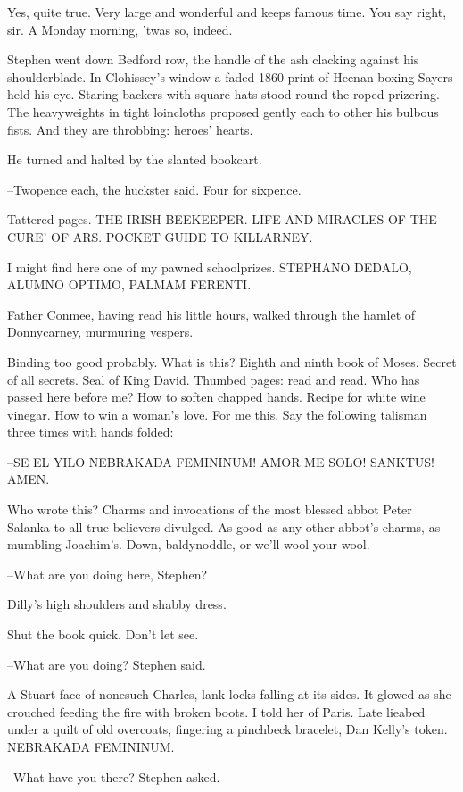 Yes, quite true. Very large and wonderful and keeps famous time. You say
right, sir. A Monday morning, 'twas so, indeed.

Stephen went down Bedford row,
the handle of the ash clacking against his
shoulderblade. In Clohissey's window a faded 1860 print of Heenan boxing
Sayers held his eye. Staring backers with square hats stood round the
roped prizering. The heavyweights in tight loincloths proposed gently
each to other his bulbous fists. And they are throbbing: heroes' hearts.

He turned and halted by the slanted bookcart.

--Twopence each, the huckster said. Four for sixpence.

Tattered pages. THE IRISH BEEKEEPER. LIFE AND MIRACLES OF THE CURE' OF
ARS. POCKET GUIDE TO KILLARNEY.

I might find here one of my pawned schoolprizes.
STEPHANO DEDALO, ALUMNO OPTIMO, PALMAM FERENTI.

Father Conmee, having read his little hours, walked through the hamlet of
Donnycarney, murmuring vespers.

Binding too good probably. What is this? Eighth and ninth book of Moses.
Secret of all secrets. Seal of King David. Thumbed pages: read and read.
Who has passed here before me? How to soften chapped hands. Recipe for
white wine vinegar. How to win a woman's love. For me this. Say the
following talisman three times with hands folded:

--SE EL YILO NEBRAKADA FEMININUM! AMOR ME SOLO! SANKTUS! AMEN.

Who wrote this?
Charms and invocations of the most blessed abbot Peter Salanka
to all true believers divulged. As good as any other abbot's
charms, as mumbling Joachim's. Down, baldynoddle, or we'll wool your
wool.

--What are you doing here, Stephen?

Dilly's high shoulders and shabby dress.

Shut the book quick. Don't let see.

--What are you doing? Stephen said.

A Stuart face of nonesuch Charles,
lank locks falling at its sides.
It glowed as she crouched feeding the fire with broken boots.
I told her of Paris.
Late lieabed under a quilt of old overcoats,
fingering a pinchbeck bracelet,
Dan Kelly's token.
NEBRAKADA FEMININUM.

--What have you there? Stephen asked.

